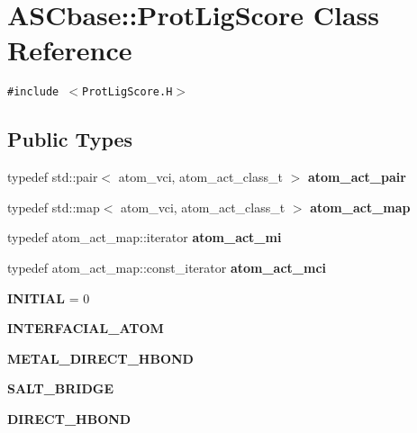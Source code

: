 \section{ASCbase::Prot\-Lig\-Score Class Reference}
\label{classASCbase_1_1ProtLigScore}
{\tt \#include $<$Prot\-Lig\-Score.H$>$}

\subsection*{Public Types}
\begin{CompactItemize}
\item 
typedef std::pair$<$ atom\_\-vci, atom\_\-act\_\-class\_\-t $>$ \textbf{atom\_\-act\_\-pair}\label{classASCbase_1_1ProtLigScore_27d6d786f7b39152b361b23dd9d5bbbb}

\item 
typedef std::map$<$ atom\_\-vci, atom\_\-act\_\-class\_\-t $>$ \textbf{atom\_\-act\_\-map}\label{classASCbase_1_1ProtLigScore_ce33f05b2e4c44c586465cf372a608ec}

\item 
typedef atom\_\-act\_\-map::iterator \textbf{atom\_\-act\_\-mi}\label{classASCbase_1_1ProtLigScore_919ad4c17215dc1ca9072def5d1f6f80}

\item 
typedef atom\_\-act\_\-map::const\_\-iterator \textbf{atom\_\-act\_\-mci}\label{classASCbase_1_1ProtLigScore_bdea38e65c716d29e71ed2e4521eb36b}

\item 
\textbf{INITIAL} = 0\label{classASCbase_1_1ProtLigScore_38da0bbb70c6f5a88b37e99939fa72117efb63b928321c54411b880623ea0fb6}

\item 
\textbf{INTERFACIAL\_\-ATOM}\label{classASCbase_1_1ProtLigScore_38da0bbb70c6f5a88b37e99939fa7211500e8743a0b378fddf0d53d673a40b47}

\item 
\textbf{METAL\_\-DIRECT\_\-HBOND}\label{classASCbase_1_1ProtLigScore_38da0bbb70c6f5a88b37e99939fa7211e93fbf76a21bb4ea027750f686e0fece}

\item 
\textbf{SALT\_\-BRIDGE}\label{classASCbase_1_1ProtLigScore_38da0bbb70c6f5a88b37e99939fa72112a51642889c858139d7b520652703b81}

\item 
\textbf{DIRECT\_\-HBOND}\label{classASCbase_1_1ProtLigScore_38da0bbb70c6f5a88b37e99939fa7211803e8fc1cf125b935a73b960416972aa}


\end{CompactItemize}
